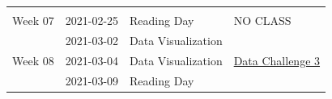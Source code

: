 \documentclass[
]{book}
\begin{document}
\begin{longtable}[]{@{}llll@{}}
\begin{minipage}[t]{0.22\columnwidth}
\strut
\end{minipage}\tabularnewline
\begin{minipage}[t]{0.22\columnwidth}\raggedright
Week 07\strut
\end{minipage} & \begin{minipage}[t]{0.22\columnwidth}\raggedright
2021-02-25\strut
\end{minipage} & \begin{minipage}[t]{0.22\columnwidth}\raggedright
Reading Day\strut
\end{minipage} & \begin{minipage}[t]{0.22\columnwidth}\raggedright
NO CLASS\strut
\end{minipage}\tabularnewline
\begin{minipage}[t]{0.22\columnwidth}\raggedright
\strut
\end{minipage} & \begin{minipage}[t]{0.22\columnwidth}\raggedright
2021-03-02\strut
\end{minipage} & \begin{minipage}[t]{0.22\columnwidth}\raggedright
Data Visualization\strut
\end{minipage} & \begin{minipage}[t]{0.22\columnwidth}\raggedright
\strut
\end{minipage}\tabularnewline
\begin{minipage}[t]{0.22\columnwidth}\raggedright
Week 08\strut
\end{minipage} & \begin{minipage}[t]{0.22\columnwidth}\raggedright
2021-03-04\strut
\end{minipage} & \begin{minipage}[t]{0.22\columnwidth}\raggedright
Data Visualization\strut
\end{minipage} & \begin{minipage}[t]{0.22\columnwidth}\raggedright
\href{https://classroom.github.com/a/DtxQhRcW}{Data Challenge 3}\strut
\end{minipage}\tabularnewline
\begin{minipage}[t]{0.22\columnwidth}\raggedright
\strut
\end{minipage} & \begin{minipage}[t]{0.22\columnwidth}\raggedright
2021-03-09\strut
\end{minipage} & \begin{minipage}[t]{0.22\columnwidth}\raggedright
Reading Day\strut
\end{minipage} & \begin{minipage}[t]{0.22\columnwidth}\raggedright

\end{minipage}
\end{longtable}
\end{document}
